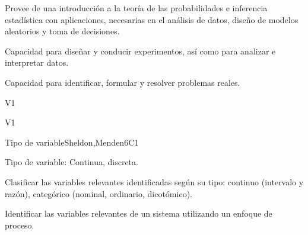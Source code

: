 
\begin{syllabus}


\begin{justification}
Provee de una introducción a la teoría de las probabilidades e inferencia estadística con aplicaciones, necesarias en el análisis de datos, diseño de modelos aleatorios y toma de decisiones.
\end{justification}

\begin{goals}
\item Capacidad para diseñar y conducir experimentos, así como para analizar e interpretar datos.
\item Capacidad para identificar, formular y resolver problemas reales.
\end{goals}

\begin{outcomes}{V1}
   \item {}
   \item {}
\end{outcomes}

\begin{competences}{V1}
    \item {} 
    \item {}
\end{competences}


\begin{unit}{Tipo de variable}{}{Sheldon,Menden}{6}{C1}
\begin{topics}
      \item Tipo de variable: Continua, discreta.
   \end{topics}

   \begin{learningoutcomes}
      \item Clasificar las variables relevantes identificadas según su tipo: continuo (intervalo y razón), categórico (nominal, ordinario, dicotómico).
      \item Identificar las variables relevantes de un sistema utilizando un enfoque de proceso.
   \end{learningoutcomes}
\end{unit}


\end{syllabus}
